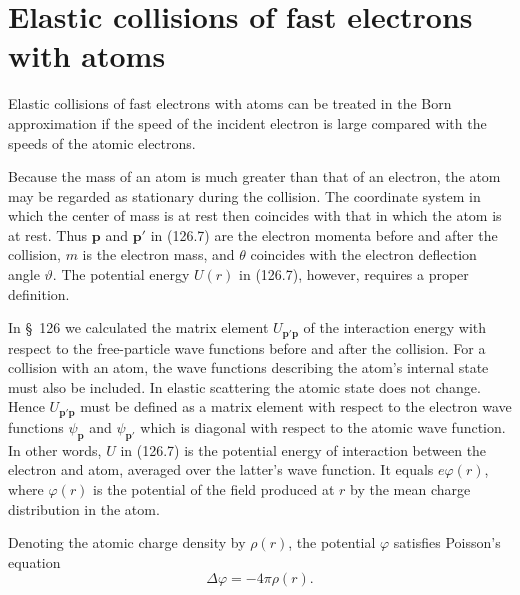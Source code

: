 \section{Elastic collisions of fast electrons with atoms}

Elastic collisions of fast electrons with atoms can be treated in the Born
approximation if the speed of the incident electron is large compared with
the speeds of the atomic electrons.

Because the mass of an atom is much greater than that of an electron, the
atom may be regarded as stationary during the collision. The coordinate
system in which the center of mass is at rest then coincides with that in
which the atom is at rest. Thus $\mathbf p$ and $\mathbf p'$ in (126.7) are
the electron momenta before and after the collision, $m$ is the electron mass,
and $\theta$ coincides with the electron deflection angle $\vartheta$. The
potential energy $U(r)$ in (126.7), however, requires a proper definition.

In \S~126 we calculated the matrix element $U_{\mathbf p'\mathbf p}$ of the
interaction energy with respect to the free-particle wave functions before
and after the collision. For a collision with an atom, the wave functions
describing the atom's internal state must also be included. In elastic
scattering the atomic state does not change. Hence
$U_{\mathbf p'\mathbf p}$ must be defined as a matrix element with respect to
the electron wave functions $\psi_{\mathbf p}$ and $\psi_{\mathbf p'}$ which
is diagonal with respect to the atomic wave function. In other words, $U$ in
(126.7) is the potential energy of interaction between the electron and atom,
averaged over the latter's wave function. It equals $e\varphi(r)$, where
$\varphi(r)$ is the potential of the field produced at $r$ by the mean charge
distribution in the atom.

Denoting the atomic charge density by $\rho(r)$, the potential $\varphi$
satisfies Poisson's equation
\[
 \Delta\varphi=-4\pi\rho(r).
\]

